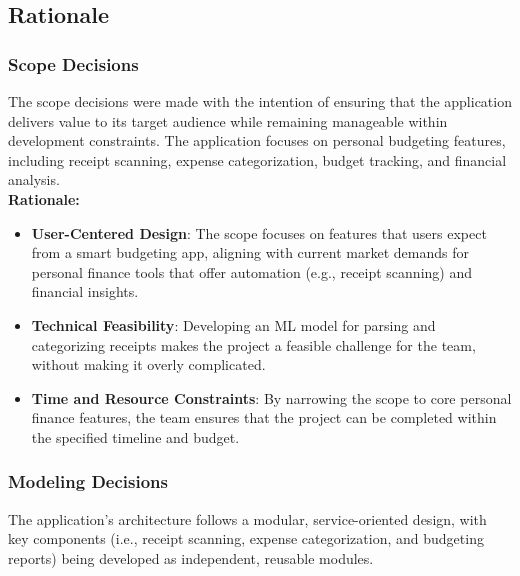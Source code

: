 \documentclass[12pt]{article}
\begin{document}
\newpage

\subsection{Rationale}

\subsubsection{Scope Decisions}
The scope decisions were made with the intention of ensuring that the
application delivers value to its target audience while remaining manageable
within development constraints. The application focuses on personal budgeting
features, including receipt scanning, expense categorization, budget tracking,
and financial analysis. \\

\noindent\textbf{Rationale:}
\begin{itemize}
    \item \textbf{User-Centered Design}: The scope focuses on features that
    users expect from a smart budgeting app, aligning with current market
    demands for personal finance tools that offer automation (e.g., receipt
    scanning) and financial insights. 
    \item \textbf{Technical Feasibility}: Developing an ML model for parsing and
    categorizing receipts makes the project a feasible challenge for the team,
    without making it overly complicated.
    \item \textbf{Time and Resource Constraints}: By narrowing the scope to core
    personal finance features, the team ensures that the project can be
    completed within the specified timeline and budget.
\end{itemize}

\subsubsection{Modeling Decisions}
The application's architecture follows a modular, service-oriented design, with key components (i.e., receipt scanning, expense categorization, and budgeting reports) being developed as independent, reusable modules.\\
\end{document}
